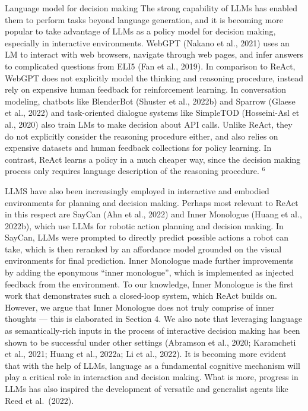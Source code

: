 \documentclass[
]{article}
\begin{document}
Language model for decision making The strong capability of LLMs has
enabled them to perform tasks beyond language generation, and it is
becoming more popular to take advantage of LLMs as a policy model for
decision making, especially in interactive environments. WebGPT (Nakano
et al., 2021) uses an LM to interact with web browsers, navigate through
web pages, and infer answers to complicated questions from ELI5 (Fan et
al., 2019). In comparison to ReAct, WebGPT does not explicitly model the
thinking and reasoning procedure, instead rely on expensive human
feedback for reinforcement learning. In conversation modeling, chatbots
like BlenderBot (Shuster et al., 2022b) and Sparrow (Glaese et al.,
2022) and task-oriented dialogue systems like SimpleTOD (Hosseini-Asl et
al., 2020) also train LMs to make decision about API calls. Unlike
ReAct, they do not explicitly consider the reasoning procedure either,
and also relies on expensive datasets and human feedback collections for
policy learning. In contrast, ReAct learns a policy in a much cheaper
way, since the decision making process only requires language
description of the reasoning procedure. \(^{6}\)

LLMS have also been increasingly employed in interactive and embodied
environments for planning and decision making. Perhaps most relevant to
ReAct in this respect are SayCan (Ahn et al., 2022) and Inner Monologue
(Huang et al., 2022b), which use LLMs for robotic action planning and
decision making. In SayCan, LLMs were prompted to directly predict
possible actions a robot can take, which is then reranked by an
affordance model grounded on the visual environments for final
prediction. Inner Monologue made further improvements by adding the
eponymous ``inner monologue'', which is implemented as injected feedback
from the environment. To our knowledge, Inner Monologue is the first
work that demonstrates such a closed-loop system, which ReAct builds on.
However, we argue that Inner Monologue does not truly comprise of inner
thoughts --- this is elaborated in Section 4. We also note that
leveraging language as semantically-rich inputs in the process of
interactive decision making has been shown to be successful under other
settings (Abramson et al., 2020; Karamcheti et al., 2021; Huang et al.,
2022a; Li et al., 2022). It is becoming more evident that with the help
of LLMs, language as a fundamental cognitive mechanism will play a
critical role in interaction and decision making. What is more, progress
in LLMs has also inspired the development of versatile and generalist
agents like Reed et al.~(2022).
\end{document}
